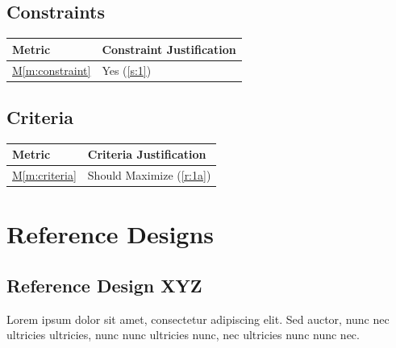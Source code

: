 \documentclass{../tex/report}
\newcommand{\mref}[1]{\hyperref[#1]{M\ref{#1}}}
\begin{document}
\clearpage


\subsection{Constraints}\label{sec:constraints}

\begin{tabular}{|l|p{14.35cm}|}
    \hline
    \textbf{Metric} & \textbf{Constraint \hfill Justification} \\
    \hline
    \mref{m:constraint} & Yes \hfill (\ref{s:1})\\
    \hline
\end{tabular}

\subsection{Criteria}\label{sec:criteria}

\begin{tabular}{|l|p{14.35cm}|}
    \hline
    \textbf{Metric} & \textbf{Criteria \hfill Justification} \\
    \hline
    \mref{m:criteria} & Should Maximize \hfill (\ref{r:1a}) \\
    \hline
\end{tabular}


\newpage

\section{Reference Designs}


\subsection{Reference Design XYZ}

Lorem ipsum dolor sit amet, consectetur adipiscing elit. Sed auctor, nunc nec ultricies ultricies, nunc nunc ultricies nunc, nec ultricies nunc nunc nec.


% 
% 
\end{document}
